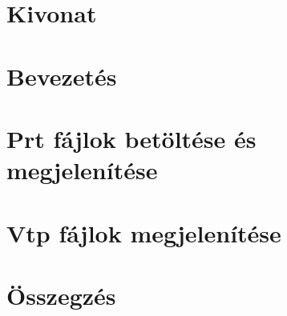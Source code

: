 \documentclass[11pt,a4paper,twoside]{report}
\begin{document}


\pagestyle{empty}
\tableofcontents



\chapter*{Kivonat}


%
\pagestyle{fancy}
\renewcommand{\chaptermark}[1]{\markboth{#1}{}}
\chapter{Bevezetés}


\chapter{Prt fájlok betöltése és megjelenítése}


\chapter{Vtp fájlok megjelenítése}


\chapter{Összegzés}


\renewcommand{\bibname}{Irodalomjegyzék}
\nocite{*}
\clearpage
{}
{}
\printbibliography

\pagestyle{empty}

\clearpage
{}
{}
\listoffigures
\end{document}
